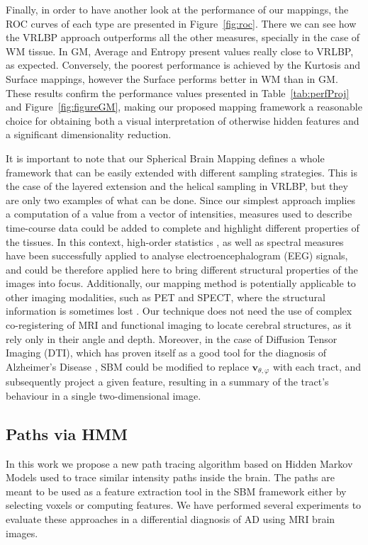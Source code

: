 Finally, in order to have another look at the performance of our mappings, the ROC curves of each type are presented in Figure~\ref{fig:roc}. There we can see how the VRLBP approach outperforms all the other measures, specially in the case of \ac{WM} tissue. In \ac{GM}, Average and Entropy present values really close to VRLBP, as expected. Conversely, the poorest performance is achieved by the Kurtosis and Surface mappings, however the Surface performs better in \ac{WM} than in \ac{GM}. These results confirm the performance values presented in  Table~\ref{tab:perfProj} and Figure~\ref{fig:figureGM}, making our proposed mapping framework a reasonable choice for obtaining both a visual interpretation of otherwise hidden features and a significant dimensionality reduction. 

It is important to note that our Spherical Brain Mapping defines a whole framework that can be easily extended with different sampling strategies. This is the case of the layered extension and the helical sampling in VRLBP, but they are only two examples of what can be done. 
Since our simplest approach implies a computation of a value from a vector of intensities, measures used to describe time-course data could be added to complete and highlight different properties of the tissues. In this context, high-order statistics \cite{Zhou2008}, as well as spectral measures \cite{Locatelli1998} have been successfully applied to analyse electroencephalogram (EEG) signals, and could be therefore applied here to bring different structural properties of the images into focus. 
Additionally, our mapping method is potentially applicable to other imaging modalities, such as PET and SPECT, where the structural information is sometimes lost \cite{IAIllan2010,Ram'irez2009}. Our technique does not need the use of complex co-registering of MRI and functional imaging to locate cerebral structures, as it rely only in their angle and depth. Moreover, in the case of Diffusion Tensor Imaging (DTI), which has proven itself as a good tool for the diagnosis of Alzheimer's Disease \cite{Grana2011,Medina2008}, \ac{SBM} could be modified to replace $\mathbf{v}_{\theta,\varphi}$ with each tract, and subsequently project a given feature, resulting in a summary of the tract's behaviour in a single two-dimensional image. 

			

\subsection{Paths via \ac{HMM}}\label{sec:discussion}
In this work we propose a new path tracing algorithm based on Hidden Markov Models used to trace similar intensity paths inside the brain. The paths are meant to be used as a feature extraction tool in the \ac{SBM} framework either by selecting voxels or computing features. We have performed several experiments to evaluate these approaches in a differential diagnosis of AD using MRI brain images. 


